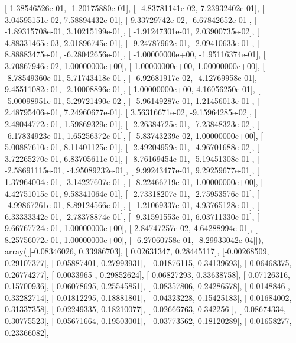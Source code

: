 \documentclass{article}
\begin{document}
       [  1.38546526e-01,  -1.20175880e-01],
       [ -4.83781141e-02,   7.23932402e-01],
       [  3.04595151e-02,   7.58894432e-01],
       [  9.33729742e-02,  -6.67842652e-01],
       [ -1.89315708e-01,   3.10215199e-01],
       [ -1.91247301e-01,   2.03900735e-02],
       [  4.88331465e-03,   2.01896745e-01],
       [ -9.24787962e-01,  -2.09410633e-01],
       [  8.88883475e-01,  -6.28042656e-01],
       [ -1.00000000e+00,  -1.95116374e-01],
       [  3.70867946e-02,   1.00000000e+00],
       [  1.00000000e+00,   1.00000000e+00],
       [ -8.78549360e-01,   5.71743418e-01],
       [ -6.92681917e-02,  -4.12769958e-01],
       [  9.45511082e-01,  -2.10008896e-01],
       [  1.00000000e+00,   4.16056250e-01],
       [ -5.00098951e-01,   5.29721490e-02],
       [ -5.96149287e-01,   1.21456013e-01],
       [  2.48795406e-01,   7.24960677e-01],
       [  3.56316671e-02,  -9.15964285e-02],
       [  2.48044772e-01,   1.59869329e-01],
       [ -2.26384725e-01,  -7.23848323e-02],
       [ -6.17834923e-01,   1.65256372e-01],
       [ -5.83743239e-02,   1.00000000e+00],
       [  5.00887610e-01,   8.11401125e-01],
       [ -2.49204959e-01,  -4.96701688e-02],
       [  3.72265270e-01,   6.83705611e-01],
       [ -8.76169454e-01,  -5.19451308e-01],
       [ -2.58691115e-01,  -4.95089232e-01],
       [  9.99243477e-01,   9.29259677e-01],
       [  1.37964004e-01,  -3.14227607e-01],
       [ -8.22466719e-01,   1.00000000e+00],
       [  4.42751015e-01,   9.58341064e-01],
       [ -2.73318207e-01,  -2.75953576e-01],
       [ -4.99867261e-01,   8.89124566e-01],
       [ -1.21069337e-01,   4.93765128e-01],
       [  6.33333342e-01,  -2.78378874e-01],
       [ -9.31591553e-01,   6.03711330e-01],
       [  9.66767724e-01,   1.00000000e+00],
       [  2.84747257e-02,   4.64288994e-01],
       [  8.25756072e-01,   1.00000000e+00],
       [ -6.27060758e-01,  -8.29933042e-04]]), array([[-0.08346026,  0.33986703],
       [ 0.02631347,  0.28445117],
       [-0.00268509,  0.29107377],
       [-0.05887401,  0.27993931],
       [ 0.01876115,  0.34139693],
       [ 0.06468375,  0.26774277],
       [-0.0033965 ,  0.29852624],
       [ 0.06827293,  0.33638758],
       [ 0.07126316,  0.15700936],
       [ 0.06078695,  0.25545851],
       [ 0.08357806,  0.24286578],
       [ 0.0148846 ,  0.33282714],
       [ 0.01812295,  0.18881801],
       [ 0.04323228,  0.15425183],
       [-0.01684002,  0.31337358],
       [ 0.02249335,  0.18210077],
       [-0.02666763,  0.342256  ],
       [-0.08674334,  0.30775523],
       [-0.05671664,  0.19503001],
       [ 0.03773562,  0.18120289],
       [-0.01658277,  0.23366082],
\end{document}
